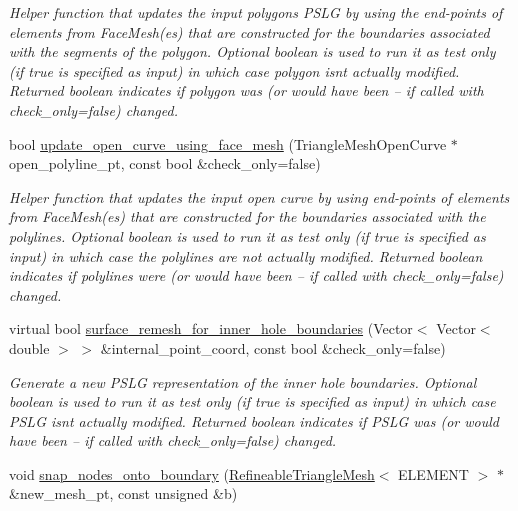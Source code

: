 \begin{DoxyCompactItemize}
\begin{DoxyCompactList}\small\item\em Helper function that updates the input polygon\textquotesingle{}s P\+S\+LG by using the end-\/points of elements from Face\+Mesh(es) that are constructed for the boundaries associated with the segments of the polygon. Optional boolean is used to run it as test only (if true is specified as input) in which case polygon isn\textquotesingle{}t actually modified. Returned boolean indicates if polygon was (or would have been -- if called with check\+\_\+only=false) changed. \end{DoxyCompactList}\item 
bool \hyperlink{classoomph_1_1RefineableTriangleMesh_ab8fb7db201e871f082afe3170ddb812f}{update\+\_\+open\+\_\+curve\+\_\+using\+\_\+face\+\_\+mesh} (Triangle\+Mesh\+Open\+Curve $\ast$open\+\_\+polyline\+\_\+pt, const bool \&check\+\_\+only=false)
\begin{DoxyCompactList}\small\item\em Helper function that updates the input open curve by using end-\/points of elements from Face\+Mesh(es) that are constructed for the boundaries associated with the polylines. Optional boolean is used to run it as test only (if true is specified as input) in which case the polylines are not actually modified. Returned boolean indicates if polylines were (or would have been -- if called with check\+\_\+only=false) changed. \end{DoxyCompactList}\item 
virtual bool \hyperlink{classoomph_1_1RefineableTriangleMesh_a7189d208a062fda132f6fa814e4385cf}{surface\+\_\+remesh\+\_\+for\+\_\+inner\+\_\+hole\+\_\+boundaries} (Vector$<$ Vector$<$ double $>$ $>$ \&internal\+\_\+point\+\_\+coord, const bool \&check\+\_\+only=false)
\begin{DoxyCompactList}\small\item\em Generate a new P\+S\+LG representation of the inner hole boundaries. Optional boolean is used to run it as test only (if true is specified as input) in which case P\+S\+LG isn\textquotesingle{}t actually modified. Returned boolean indicates if P\+S\+LG was (or would have been -- if called with check\+\_\+only=false) changed. \end{DoxyCompactList}\item 
void \hyperlink{classoomph_1_1RefineableTriangleMesh_a3c302af1c17063eb32f56abe9f000360}{snap\+\_\+nodes\+\_\+onto\+\_\+boundary} (\hyperlink{classoomph_1_1RefineableTriangleMesh}{Refineable\+Triangle\+Mesh}$<$ E\+L\+E\+M\+E\+NT $>$ $\ast$\&new\+\_\+mesh\+\_\+pt, const unsigned \&b)

\end{DoxyCompactItemize}
